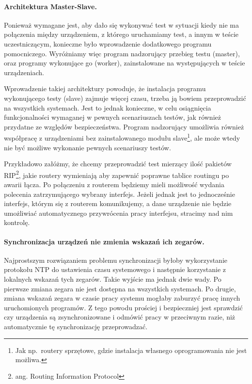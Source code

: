 \documentclass[00-praca-magisterska.tex]{subfiles}
\begin{document}
\paragraph{Architektura Master-Slave.} Ponieważ wymagane jest, aby dało się
wykonywać test w sytuacji kiedy nie ma połączenia między urządzeniem, z którego
uruchamiamy test, a innym w teście uczestniczącym, konieczne było wprowadzenie
dodatkowego programu pomocniczego. Wyróżniamy więc program nadzorujący
przebieg testu (master), oraz programy wykonujące go (worker), zainstalowane na
występujących w teście urządzeniach.

Wprowadzenie takiej architektury powoduje, że instalacja programu wykonującego
testy (slave) zajmuje więcej czasu, trzeba ją bowiem przeprowadzić na
wszystkich systemach. Jest to jednak konieczne, w celu osiągnięcia
funkcjonalności wymaganej w pewnych scenariuszach testów, jak również przydatne
ze względów bezpieczeństwa. Program nadzorujący umożliwia również
współpracę z urządzeniami bez zainstalowanego modułu slave\footnote{Jak
np.~routery sprzętowe, gdzie instalacja własnego oprogramowania nie jest
możliwa.}, ale może wtedy nie być możliwe wykonanie pewnych scenariuszy testów.

Przykładowo załóżmy, że chcemy przeprowadzić test mierzący ilość pakietów
RIP\footnote{ang. Routing Information Protocol}, jakie routery wymieniają aby
zapewnić poprawne tablice routingu po awarii łącza. Po połączeniu z routerem
będziemy mieli możliwość wydania polecenia zatrzymującego wybrany interfejs.
Jeżeli jednak jest to jednocześnie interfejs, którym się z routerem
komunikujemy, a dane urządzenie nie będzie umożliwiać automatycznego
przywrócenia pracy interfejsu, stracimy nad nim kontrolę.

\paragraph{Synchronizacja urządzeń nie zmienia wskazań ich zegarów.}
Najprostszym rozwiązaniem problemu synchronizacji byłoby wykorzystanie protokołu
NTP do ustawienia czasu systemowego i następnie korzystanie z lokalnych wskazań
tych zegarów. Takie wyjście ma jednak dwie wady. Po pierwsze zmiana zegara nie
jest dostępna na wszystkich systemach. Po drugie, zmiana wskazań zegara w czasie
pracy systemu mogłaby zaburzyć pracę innych uruchomionych programów. Z tego
powodu prościej i bezpieczniej jest sprawdzić czy urządzenia są zsynchronizowane
i odmówić pracy w przeciwnym razie, niż automatycznie tę synchronizację
przeprowadzać.
\end{document}
